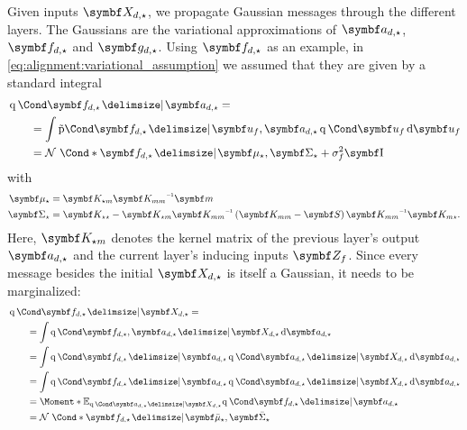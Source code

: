 Given inputs $\mat{X_{d, \star}}$, we propagate Gaussian messages through the different layers. The Gaussians are the variational approximations of $\rv{a_{d, \star}}$, $\rv{f_{d, \star}}$ and $\rv{g_{d, \star}}$.
Using $\rv{f_{d, \star}}$ as an example, in \cref{eq:alignment:variational_assumption} we assumed that they are given by a standard integral
\begin{align}
    \begin{split}
        \MoveEqLeft\Variat{\rv{f_{d, \star}} \given \rv{a_{d, \star}}} = \\
        &= \int \aProb{\rv{f_{d, \star}} \given \rv{u_f}, \rv{a_{d, \star}}}\Variat{\rv{u_f}} \diff \rv{u_f} \\
        &= \Gaussian*{\rv{f_{d, \star}} \given \mat{\mu_{\star}}, \mat{\Sigma_{\star}} + \sigma_f^2 \Eye}
    \end{split}
\end{align}
with
\begin{align*}
    \mat{\mu_{\star}}    & = \mat{K_{\star m}}\mat{K_{mm}}\inv \mat{m}                                                                                         \\
    \mat{\Sigma_{\star}} & = \mat{K_{\star\star}} - \mat{K_{\star m}}\mat{K_{mm}}\inv \left(  \mat{K_{mm}} - \mat{S} \right) \mat{K_{mm}}\inv\mat{K_{m\star}}.
\end{align*}
Here, $\mat{K_{\star m}}$ denotes the kernel matrix of the previous layer's output $\rv{a_{d, \star}}$ and the current layer's inducing inputs $\mat{Z_f}$.
Since every message besides the initial $\rv{X_{d, \star}}$ is itself a Gaussian, it needs to be marginalized:
\begin{align}
    \begin{split}
        \MoveEqLeft\Variat{\rv{f_{d, \star}} \given \rv{X_{d, \star}}} = \\
        &= \int \Variat{\rv{f_{d, \star}}, \rv{a_{d, \star}} \given \rv{X_{d, \star}}} \diff \rv{a_{d, \star}} \\
        &= \int \Variat{\rv{f_{d, \star}} \given \rv{a_{d, \star}}} \Variat{\rv{a_{d, \star}} \given \rv{X_{d, \star}}} \diff \rv{a_{d, \star}} \\
        &= \int \Variat{\rv{f_{d, \star}} \given \rv{a_{d, \star}}} \Variat{\rv{a_{d, \star}} \given \rv{X_{d, \star}}} \diff \rv{a_{d, \star}} \\
        &= \Moment*{\E_{\Variat{\rv{a_{d, \star}} \given \rv{X_{d, \star}}}}}{\Variat{\rv{f_{d, \star}} \given \rv{a_{d, \star}}}} \\
        &= \Gaussian*{\rv{f_{d, \star}} \given \mat{\bar{\mu}_{\star}}, \mat{\bar{\Sigma}_{\star}}}
    \end{split}
\end{align}
